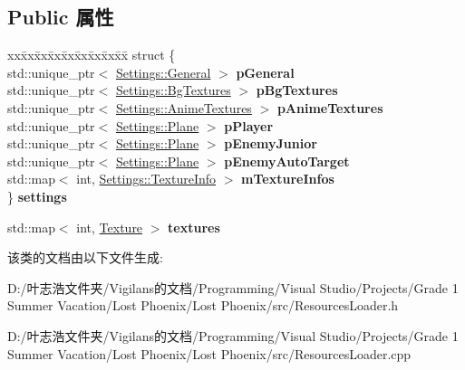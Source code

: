 \subsection*{Public 属性}
\begin{DoxyCompactItemize}
\item 
\mbox{\label{class_resources_loader_a355d825da8f96dc10cd17fc659e599ae}} 
\begin{tabbing}
xx\=xx\=xx\=xx\=xx\=xx\=xx\=xx\=xx\=\kill
struct \{\\
\>std::unique\_ptr$<$ \hyperlink{struct_settings_1_1_general}{Settings::General} $>$ {\bfseries pGeneral}\\
\>std::unique\_ptr$<$ \hyperlink{struct_settings_1_1_bg_textures}{Settings::BgTextures} $>$ {\bfseries pBgTextures}\\
\>std::unique\_ptr$<$ \hyperlink{struct_settings_1_1_anime_textures}{Settings::AnimeTextures} $>$ {\bfseries pAnimeTextures}\\
\>std::unique\_ptr$<$ \hyperlink{struct_settings_1_1_plane}{Settings::Plane} $>$ {\bfseries pPlayer}\\
\>std::unique\_ptr$<$ \hyperlink{struct_settings_1_1_plane}{Settings::Plane} $>$ {\bfseries pEnemyJunior}\\
\>std::unique\_ptr$<$ \hyperlink{struct_settings_1_1_plane}{Settings::Plane} $>$ {\bfseries pEnemyAutoTarget}\\
\>std::map$<$ int, \hyperlink{struct_settings_1_1_texture_info}{Settings::TextureInfo} $>$ {\bfseries mTextureInfos}\\
\} {\bfseries settings}\\

\end{tabbing}\item 
\mbox{\label{class_resources_loader_a5b18435b040ae9562a84570712be922c}} 
std\+::map$<$ int, \hyperlink{struct_texture}{Texture} $>$ {\bfseries textures}
\end{DoxyCompactItemize}


该类的文档由以下文件生成\+:\begin{DoxyCompactItemize}
\item 
D\+:/叶志浩文件夹/\+Vigilans的文档/\+Programming/\+Visual Studio/\+Projects/\+Grade 1 Summer Vacation/\+Lost Phoenix/\+Lost Phoenix/src/Resources\+Loader.\+h\item 
D\+:/叶志浩文件夹/\+Vigilans的文档/\+Programming/\+Visual Studio/\+Projects/\+Grade 1 Summer Vacation/\+Lost Phoenix/\+Lost Phoenix/src/Resources\+Loader.\+cpp\end{DoxyCompactItemize}
